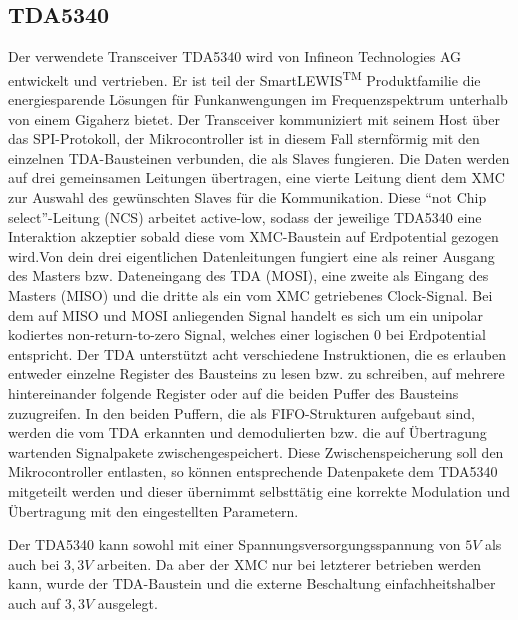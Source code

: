 \subsection{TDA5340}
Der verwendete Transceiver TDA5340 wird von Infineon Technologies AG  entwickelt und vertrieben. Er ist teil der SmartLEWIS\textsuperscript{TM} Produktfamilie die  energiesparende Lösungen für Funkanwengungen im Frequenzspektrum unterhalb von einem Gigaherz bietet. 
Der Transceiver kommuniziert mit seinem Host über das \ac{SPI}-Protokoll, der Mikrocontroller ist in diesem Fall sternförmig mit den einzelnen TDA-Bausteinen verbunden, die als Slaves fungieren. Die Daten werden auf drei gemeinsamen Leitungen übertragen, eine vierte Leitung dient dem XMC zur Auswahl des gewünschten Slaves für die Kommunikation. Diese \enquote{not Chip select}-Leitung (NCS) arbeitet active-low, sodass der jeweilige TDA5340 eine Interaktion akzeptier sobald diese vom XMC-Baustein auf Erdpotential gezogen wird.Von dein drei eigentlichen Datenleitungen fungiert eine als reiner Ausgang des Masters bzw. Dateneingang des TDA (MOSI), eine zweite als Eingang des Masters (MISO) und die dritte als ein vom XMC getriebenes Clock-Signal. Bei dem auf MISO und MOSI anliegenden Signal handelt es sich um ein unipolar kodiertes non-return-to-zero Signal, welches einer logischen $0$ bei Erdpotential entspricht. Der TDA unterstützt acht verschiedene Instruktionen, die es erlauben entweder einzelne Register des Bausteins zu lesen bzw. zu schreiben, auf mehrere hintereinander folgende Register  oder auf die beiden Puffer des Bausteins zuzugreifen. In den beiden Puffern, die als \ac{FIFO}-Strukturen  aufgebaut sind, werden die vom TDA erkannten und demodulierten bzw. die auf Übertragung wartenden Signalpakete zwischengespeichert. Diese Zwischenspeicherung soll den Mikrocontroller entlasten, so können entsprechende Datenpakete dem TDA5340 mitgeteilt werden und dieser übernimmt selbsttätig eine korrekte Modulation und Übertragung mit den eingestellten Parametern. 

Der TDA5340 kann sowohl mit einer Spannungsversorgungsspannung von $5V$ als auch bei $3,3V$ arbeiten. Da aber der XMC nur bei letzterer betrieben werden kann, wurde der TDA-Baustein und die externe Beschaltung einfachheitshalber auch auf  $3,3V$ ausgelegt. 



